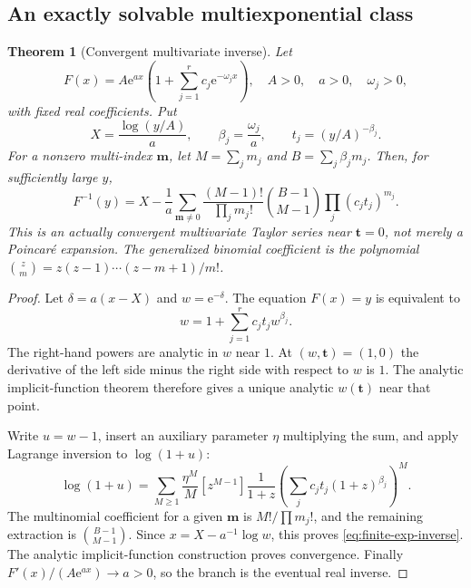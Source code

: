 \documentclass[11pt,a4paper]{article}
\numberwithin{equation}{section}
\newtheorem{theorem}{Theorem}[section]
\theoremstyle{definition}
\theoremstyle{remark}
\newcommand{\ee}{\mathrm e}
\begin{document}
\subsection{An exactly solvable multiexponential class}

\begin{theorem}[Convergent multivariate inverse]
\label{thm:finite-exp}
Let
\begin{equation}
 F(x)=A\ee^{ax}\left(1+\sum_{j=1}^r c_j\ee^{-\omega_jx}\right),
 \quad A>0,\quad a>0,\quad \omega_j>0,
 \label{eq:finite-exp}
\end{equation}
with fixed real coefficients. Put
\[
 X=\frac{\log(y/A)}a,\qquad
 \beta_j=\frac{\omega_j}{a},\qquad
 t_j=(y/A)^{-\beta_j}.
\]
For a nonzero multi-index $\bm m$, let $M=\sum_jm_j$ and
$B=\sum_j\beta_jm_j$. Then, for sufficiently large $y$,
\begin{equation}
 F^{-1}(y)=X-\frac1a
 \sum_{\bm m\ne0}
 \frac{(M-1)!}{\prod_jm_j!}
 \binom{B-1}{M-1}\prod_j(c_jt_j)^{m_j}.
 \label{eq:finite-exp-inverse}
\end{equation}
This is an actually convergent multivariate Taylor series near $\bm t=0$, not merely a Poincar\'e expansion. The generalized binomial coefficient is the polynomial
$\binom{z}{m}=z(z-1)\cdots(z-m+1)/m!$.
\end{theorem}
\begin{proof}
Let $\delta=a(x-X)$ and $w=\ee^{-\delta}$. The equation $F(x)=y$ is equivalent to
\begin{equation}
 w=1+\sum_{j=1}^r c_jt_jw^{\beta_j}.
 \label{eq:w-finite}
\end{equation}
The right-hand powers are analytic in $w$ near $1$. At $(w,\bm t)=(1,0)$ the derivative of the left side minus the right side with respect to $w$ is $1$. The analytic implicit-function theorem therefore gives a unique analytic $w(\bm t)$ near that point.

Write $u=w-1$, insert an auxiliary parameter $\eta$ multiplying the sum, and apply Lagrange inversion to $\log(1+u)$:
\[
 \log(1+u)=\sum_{M\ge1}\frac{\eta^M}{M}
 [z^{M-1}]\frac1{1+z}
       \left(\sum_jc_jt_j(1+z)^{\beta_j}\right)^M.
\]
The multinomial coefficient for a given $\bm m$ is $M!/\prod m_j!$, and the remaining extraction is $\binom{B-1}{M-1}$. Since $x=X-a^{-1}\log w$, this proves \eqref{eq:finite-exp-inverse}. The analytic implicit-function construction proves convergence. Finally $F'(x)/(A\ee^{ax})\to a>0$, so the branch is the eventual real inverse.
\end{proof}
\end{document}
